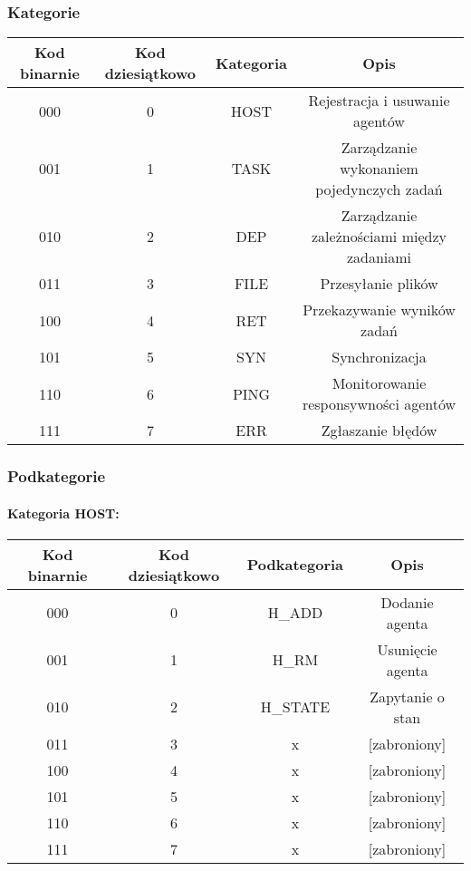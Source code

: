 \documentclass[10pt,a4paper]{article}
\begin{document}
	        \subsubsection{Kategorie}
		        \begin{tabular}{ c | c | c | c }
				    \textbf{Kod binarnie} & \textbf{Kod dziesiątkowo} & \textbf{Kategoria} & \textbf{Opis} \\
				    \hline
				    000 & 0 & HOST & Rejestracja i usuwanie agentów \\
				    001 & 1 & TASK & Zarządzanie wykonaniem pojedynczych zadań \\
				    010 & 2 & DEP & Zarządzanie zależnościami między zadaniami \\
				    011 & 3 & FILE & Przesyłanie plików \\
				    100 & 4 & RET & Przekazywanie wyników zadań \\
				    101 & 5 & SYN & Synchronizacja \\
				    110 & 6 & PING & Monitorowanie responsywności agentów \\
				    111 & 7 & ERR & Zgłaszanie błędów \\
				\end{tabular} 
					
			\subsubsection{Podkategorie}
			
			 \paragraph{Kategoria HOST:\\}
			    
		        \begin{tabular}{ c | c | c | c }
				    \textbf{Kod binarnie} & \textbf{Kod dziesiątkowo} & \textbf{Podkategoria} & \textbf{Opis} \\
				    \hline
				    000 & 0 & H\_ADD & Dodanie agenta \\
				    001 & 1 & H\_RM & Usunięcie agenta \\
				    010 & 2 & H\_STATE & Zapytanie o stan \\
				    011 & 3 & x & [zabroniony] \\
				    100 & 4 & x & [zabroniony] \\
				    101 & 5 & x & [zabroniony] \\
				    110 & 6 & x & [zabroniony] \\
				    111 & 7 & x & [zabroniony] \\
				\end{tabular}
				
\end{document}
